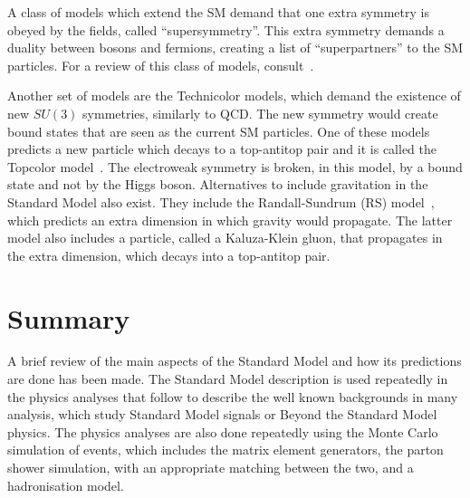 A class of models which extend the SM demand that one extra symmetry is obeyed by the fields, called ``supersymmetry''.
This extra symmetry demands a duality between bosons and fermions, creating a list of ``superpartners'' to the SM particles.
For a review of this class of models,
consult~\cite{susyreview}.

Another set of models are the Technicolor models, which demand the existence of new $SU(3)$ symmetries, similarly to QCD. The new symmetry would create bound states
that are seen as the current SM particles. One of these models predicts a new particle which decays to a top-antitop pair and it is called the Topcolor
model~\cite{Hill:1994hp,Harris:1999ya,Harris:2011ez}. The electroweak symmetry is broken, in this model, by a bound state and not by the Higgs boson.
Alternatives to include gravitation in the Standard Model also exist. They include the Randall-Sundrum (RS) model~\cite{Lillie:2007yh,Lillie:2007ve},
which predicts an extra dimension in which gravity would propagate. The latter model also includes a particle, called a Kaluza-Klein gluon,
that propagates in the extra dimension, which decays into
a top-antitop pair.

\section{Summary}

A brief review of the main aspects of the Standard Model and how its predictions are done has been made. The Standard Model description is used repeatedly in the
physics analyses that follow to describe the well known backgrounds in many analysis, which study Standard Model signals or Beyond the Standard Model physics.
The physics analyses are also done repeatedly using the Monte Carlo simulation of events, which includes the matrix element generators, the parton shower simulation, with
an appropriate matching between the two, and a hadronisation model.
